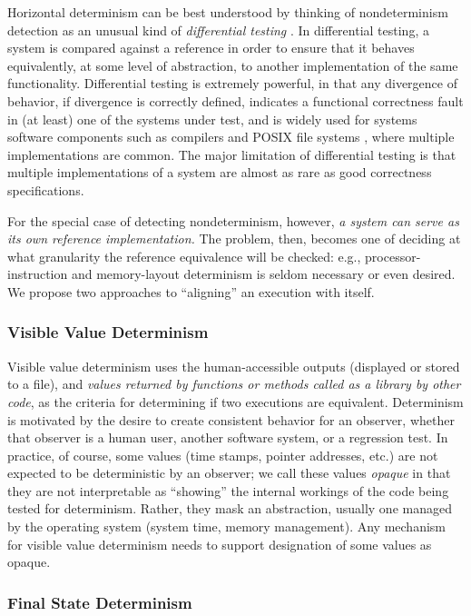 Horizontal determinism can be best understood by thinking of
nondeterminism detection as an unusual kind of \emph{differential
  testing} \cite{Differential,ICSEDiff}.  In differential testing, a
system is compared against a reference in order to ensure that
it behaves equivalently, at some level of abstraction, to another
implementation of the same functionality.  Differential testing is
extremely powerful, in that any divergence of behavior, if divergence
is correctly defined, indicates a functional correctness fault in (at
least) one of the systems under test, and  is widely
used for systems software components such as compilers
\cite{Differential,csmith} and POSIX file systems \cite{CFV08,AMAI}, where multiple
implementations are common.  The major limitation of differential
testing is that multiple implementations of a system are
almost as rare as good correctness specifications.

For the special case of detecting nondeterminism, however, \emph{a
  system can serve as its own reference implementation.}    The
problem, then, becomes one of deciding at what granularity the
reference equivalence will be checked:  e.g., 
processor-instruction and memory-layout determinism is seldom
necessary or even desired.  We propose two approaches to ``aligning'' an
execution with itself.

\subsubsection{Visible Value Determinism}

Visible value determinism uses the human-accessible outputs (displayed
or stored to a file), and \emph{values returned by functions or methods
called as a library by other code}, as the criteria for determining if two executions
are equivalent.  Determinism is motivated by the
desire to create consistent behavior for an observer, whether that
observer is a human user, another software system, or a regression
test.  In practice, of course, some values (time
stamps, pointer addresses, etc.) are not expected to be deterministic
by an observer; we call these values \emph{opaque} in that they are
not interpretable as ``showing'' the internal workings of the code
being tested for determinism.  Rather, they mask an abstraction,
usually one managed by the operating system (system
time, memory management).   Any mechanism for visible value
determinism needs to support designation of some
values as opaque.

\subsubsection{Final State Determinism}

